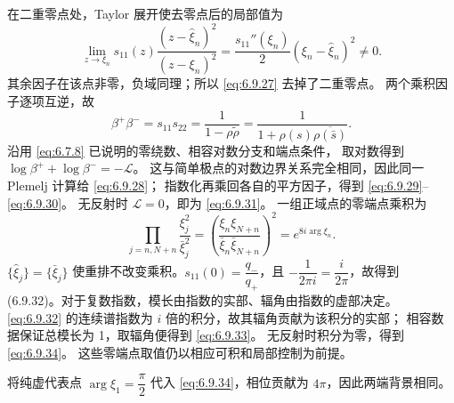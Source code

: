 \documentclass[lang=cn,scheme=chinese,mode=simple,device=normal,color=blue,
math=cm,thmcnt=section,12pt]{elegantbook}
\begin{document}
\begin{callout}[计算：双零点迹公式到两端相位的等式链]
    在二重零点处，Taylor 展开使去零点后的局部值为
    \[
        \lim\limits_{z\to\xi_n}s_{11}(z)\dfrac{(z-\widehat\xi_n)^2}{(z-\xi_n)^2}
        =\dfrac{s_{11}''(\xi_n)}{2}(\xi_n-\widehat\xi_n)^2\ne0.
    \]
    其余因子在该点非零，负域同理；所以 \eqref{eq:6.9.27} 去掉了二重零点。
    两个乘积因子逐项互逆，故
    \[
        \beta^+\beta^-=s_{11}s_{22}=\dfrac{1}{1-\rho\widetilde\rho}
        =\dfrac{1}{1+\rho(s)\overline{\rho(\bar s)}}.
    \]
    沿用 \eqref{eq:6.7.8} 已说明的零绕数、相容对数分支和端点条件，
    取对数得到 $\log\beta^++\log\beta^-=-\mathcal L$。
    这与简单极点的对数边界关系完全相同，因此同一 Plemelj 计算给 \eqref{eq:6.9.28}；
    指数化再乘回各自的平方因子，得到 \eqref{eq:6.9.29}--\eqref{eq:6.9.30}。
    无反射时 $\mathcal L=0$，即为 \eqref{eq:6.9.31}。
    一组正域点的零端点乘积为
    \[
        \prod_{j=n,N+n}\dfrac{\xi_j^2}{\bar\xi_j^2}
        =\left(\dfrac{\xi_n\xi_{N+n}}{\bar\xi_n\bar\xi_{N+n}}\right)^2=e^{8i\arg\xi_n}.
    \]
    $\{\widehat\xi_j\}=\{\bar\xi_j\}$ 使重排不改变乘积。$s_{11}(0)=\dfrac{q_-}{q_+}$，且 $-\dfrac{1}{2\pi i}=\dfrac{i}{2\pi}$，故得到 (6.9.32)。对于复数指数，模长由指数的实部、辐角由指数的虚部决定。
    \eqref{eq:6.9.32} 的连续谱指数为 $i$ 倍的积分，故其辐角贡献为该积分的实部；
    相容数据保证总模长为 1，取辐角便得到 \eqref{eq:6.9.33}。
    无反射时积分为零，得到 \eqref{eq:6.9.34}。
    这些零端点取值仍以相应可积和局部控制为前提。
\end{callout}

将纯虚代表点 $\arg\xi_1=\dfrac{\pi}{2}$ 代入 \eqref{eq:6.9.34}，相位贡献为 $4\pi$，因此两端背景相同。
\end{document}
